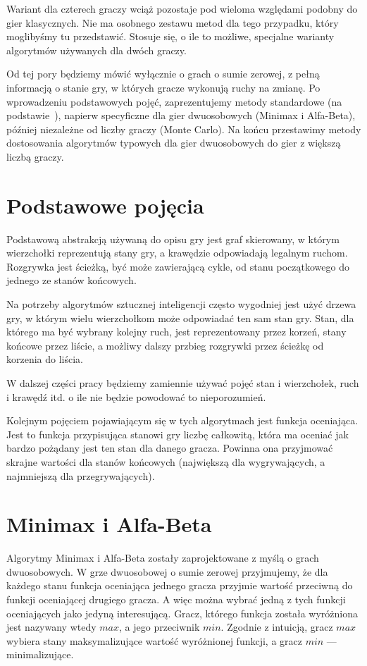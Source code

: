 \documentclass{pracamgr}
\begin{document}
Wariant dla czterech graczy wciąż pozostaje pod wieloma względami podobny do gier klasycznych.
Nie ma osobnego zestawu metod dla tego przypadku, który moglibyśmy tu przedstawić.
Stosuje się, o ile to możliwe, specjalne warianty algorytmów używanych dla dwóch graczy.

Od tej pory będziemy mówić wyłącznie o grach o sumie zerowej, z pełną informacją o stanie gry, w których gracze wykonują ruchy na zmianę.
Po wprowadzeniu podstawowych pojęć, zaprezentujemy metody standardowe (na podstawie~\cite{pawlewicz}), napierw specyficzne dla gier dwuosobowych (Minimax i Alfa-Beta), później niezależne od liczby graczy (Monte Carlo).
Na końcu przestawimy metody dostosowania algorytmów typowych dla gier dwuosobowych do gier z większą liczbą graczy.

\section{Podstawowe pojęcia}

Podstawową abstrakcją używaną do opisu gry jest graf skierowany, w którym wierzchołki reprezentują stany gry, a krawędzie odpowiadają legalnym ruchom.
Rozgrywka jest ścieżką, być może zawierającą cykle, od stanu początkowego do jednego ze stanów końcowych.

Na potrzeby algorytmów sztucznej inteligencji często wygodniej jest użyć drzewa gry, w którym wielu wierzchołkom może odpowiadać ten sam stan gry.
Stan, dla którego ma być wybrany kolejny ruch, jest reprezentowany przez korzeń, stany końcowe przez liście, a możliwy dalszy przbieg rozgrywki przez ścieżkę od korzenia do liścia.

W dalszej części pracy będziemy zamiennie używać pojęć stan i wierzchołek, ruch i krawędź itd. o ile nie będzie powodować to nieporozumień.

Kolejnym pojęciem pojawiającym się w tych algorytmach jest funkcja oceniająca.
Jest to funkcja przypisująca stanowi gry liczbę całkowitą, która ma oceniać jak bardzo pożądany jest ten stan dla danego gracza.
Powinna ona przyjmować skrajne wartości dla stanów końcowych (największą dla wygrywających, a najmniejszą dla przegrywających).

\section{Minimax i Alfa-Beta}

Algorytmy Minimax i Alfa-Beta zostały zaprojektowane z myślą o grach dwuosobowych.
W grze dwuosobowej o sumie zerowej przyjmujemy, że dla każdego stanu funkcja oceniająca jednego gracza przyjmie wartość przeciwną do funkcji oceniającej drugiego gracza.
A więc można wybrać jedną z tych funkcji oceniających jako jedyną interesującą.
Gracz, którego funkcja została wyróżniona jest nazywany wtedy \(max\), a jego przeciwnik \(min\).
Zgodnie z intuicją, gracz \(max\) wybiera stany maksymalizujące wartość wyróżnionej funkcji, a gracz \(min\) --- minimalizujące.
\end{document}
